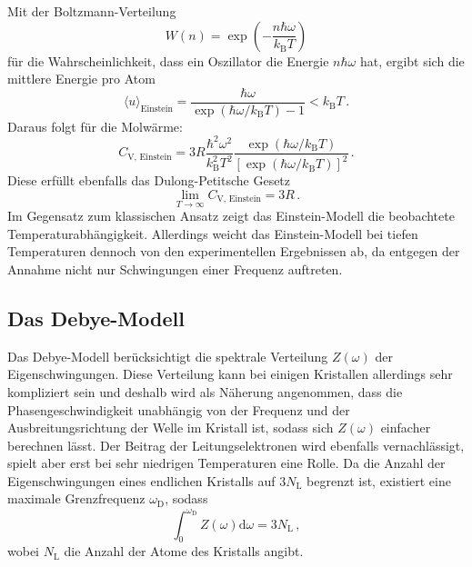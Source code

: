 Mit der Boltzmann-Verteilung
\begin{equation*}
  W(n) = \exp\left( -\frac{n\hbar\omega}{k_\text{B}T} \right)
\end{equation*}
für die Wahrscheinlichkeit, dass ein Oszillator die Energie $n\hbar\omega$ hat, ergibt sich die mittlere Energie pro Atom
\begin{equation}
  \langle u \rangle_\text{Einstein} = \frac{\hbar\omega}{\exp(\hbar\omega/k_\text{B}T) - 1} < k_\text{B}T \,.
\end{equation}
Daraus folgt für die Molwärme:
\begin{equation}
  C_\text{V, Einstein} = 3R\frac{\hbar^2\omega^2}{k_\text{B}^2T^2}
                          \frac{\exp(\hbar\omega/k_\text{B}T)}{\left[\exp(\hbar\omega/k_\text{B}T)\right]^2} \,.
\end{equation}
Diese erfüllt ebenfalls das Dulong-Petitsche Gesetz
\begin{equation*}
  \lim_{T\to\infty} C_\text{V, Einstein} = 3R\,.
\end{equation*}
Im Gegensatz zum klassischen Ansatz zeigt das Einstein-Modell die beobachtete Temperaturabhängigkeit. Allerdings weicht das
Einstein-Modell bei tiefen Temperaturen dennoch von den experimentellen Ergebnissen ab, da entgegen der Annahme
nicht nur Schwingungen einer Frequenz auftreten.

\subsection{Das Debye-Modell}
Das Debye-Modell berücksichtigt die spektrale Verteilung $Z(\omega)$ der Eigenschwingungen. Diese Verteilung kann bei einigen
Kristallen allerdings sehr kompliziert sein und deshalb wird als Näherung angenommen, dass die Phasengeschwindigkeit
unabhängig von der Frequenz und der Ausbreitungsrichtung der Welle im Kristall ist, sodass sich $Z(\omega)$ einfacher berechnen lässt.
Der Beitrag der Leitungselektronen wird ebenfalls vernachlässigt, spielt aber erst bei sehr niedrigen Temperaturen eine Rolle.
Da die Anzahl der Eigenschwingungen eines endlichen Kristalls auf $3N_\text{L}$ begrenzt ist, existiert eine maximale Grenzfrequenz $\omega_\text{D}$,
sodass
\begin{equation}
  \int_0^{\omega_\text{D}} Z(\omega)\text{d}\omega = 3N_\text{L}\,,
\end{equation}
wobei $N_\text{L}$ die Anzahl der Atome des Kristalls angibt.

